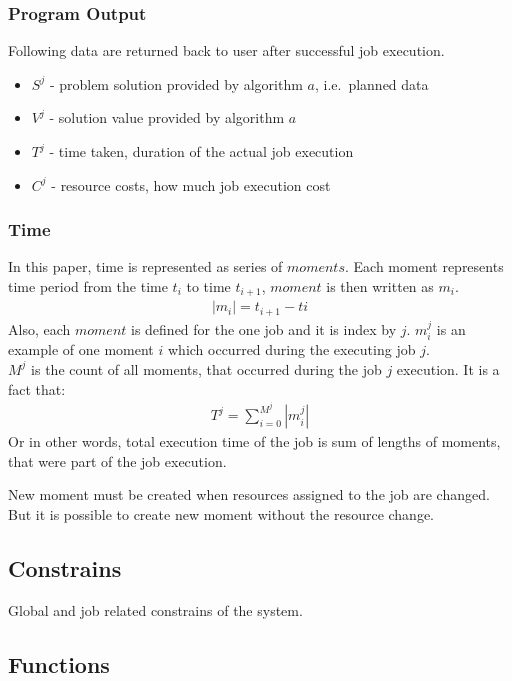 \subsubsection{Program Output}
Following data are returned back to user after successful job execution.

\begin{itemize}
    \item $S^{j}$ - problem solution provided by algorithm $a$, i.e.\ planned data
    \item $V^{j}$ - solution value provided by algorithm $a$
    \item $T^{j}$ - time taken, duration of the actual job execution
    \item $C^{j}$ - resource costs, how much job execution cost
\end{itemize}

\subsubsection{Time}
In this paper, time is represented as series of $moments$.
Each moment represents time period from the time $t_i$ to time $t_{i+1}$,
$moment$ is then written as $m_i$.
\begin{align*}
    |m_{i}| = t_{i+1} - t{i}
\end{align*}
Also, each $moment$ is defined for the one job and it is index by $j$.
$m_{i}^{j}$ is an example of one moment $i$ which occurred during the executing job $j$.\\
$M^{j}$ is the count of all moments, that occurred during the job $j$ execution.
It is a fact that:
\begin{align*}
    T^{j} = \sum_{i = 0}^{M^{j}} | m_{i}^{j} |
\end{align*}
Or in other words, total execution time of the job is sum of lengths of moments, that were part of the job execution.

New moment must be created when resources assigned to the job are changed.
But it is possible to create new moment without the resource change.

\subsection{Constrains}\label{subsec:constrains}
Global and job related constrains of the system.


\subsection{Functions}\label{subsec:functions}

